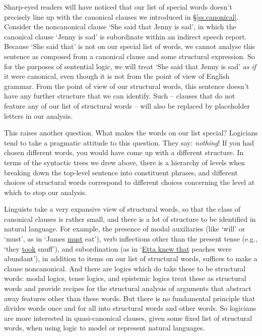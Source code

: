 Sharp-eyed readers will have noticed that our list of special words doesn't precisely line up with the canonical clauses we introduced in §\ref{ss.canonical}. Consider the noncanonical clause `She said that Jenny is sad', in which the canonical clause `Jenny is sad' is subordinate within an indirect speech report. Because `She said that' is not on our special list of words, we cannot analyse this sentence as composed from a canonical clause and some structural expression. So for the purposes of sentential logic, we will treat `She said that Jenny is sad' \emph{as if} it were canonical, even though it is not from the point of view of English grammar. From the point of view of our structural words, this sentence doesn't have any further structure that we can identify. Such  – clauses that do not feature any of our list of structural words – will also be replaced by placeholder letters in our analysis. 


This raises another question. What makes the words on our list special? Logicians tend to take a pragmatic attitude to this question. They say: \emph{nothing}! If you had chosen different words, you would have come up with a different structure. In terms of the syntactic trees we drew above, there is a hierarchy of levels when breaking down the top-level sentence into constituent phrases, and different choices of structural words correspond to different choices concerning the level at which to stop our analysis.

Linguists take a very expansive view of structural words, so that the class of canonical clauses is rather small, and there is a lot of structure to be identified in natural language. For example, the presence of modal auxiliaries (like `will' or `must', as in `James \underline{must} eat'), verb inflections other than the present tense (e.g., `they \underline{took} snuff'), and subordination (as in `\underline{Etta knew that} peaches were abundant'), in addition to items on our list of structural words, suffices to make a clause noncanonical. And there are logics which do take these to be structural words: modal logics, tense logics, and epistemic logics treat these as structural words and provide recipes for the structural analysis of arguments that abstract away features other than these words. But there is no fundamental principle that divides words once and for all into structural words and other words. So logicians are more interested in quasi-canonical clauses, given some fixed list of structural words, when using logic to model or represent natural languages. 

